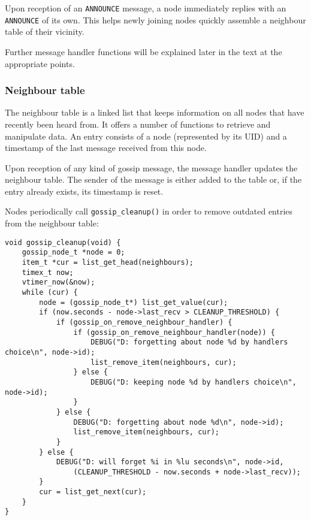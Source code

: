 \documentclass[11pt,
  a4paper,
  ngerman,
  BCOR=7mm
]{scrartcl}
\begin{document}
Upon reception of an \lstinline!ANNOUNCE! message, a node immediately
replies with an \lstinline!ANNOUNCE! of its own. This helps newly
joining nodes quickly assemble a neighbour table of their vicinity.

Further message handler functions will be explained later in the text at
the appropriate points.

\subsubsection*{Neighbour table}
\label{ssub:neighbour_table}
The neighbour table is a linked list that keeps information on all nodes
that have recently been heard from. It offers a number of functions to
retrieve and manipulate data. An entry consists of a node (represented
by its UID) and a timestamp of the last message received from this node.

Upon reception of any kind of gossip message, the message handler
updates the neighbour table. The sender of the message is either added
to the table or, if the entry already exists, its timestamp is reset. 

Nodes periodically call \lstinline!gossip_cleanup()! in order to remove
outdated entries from the neighbour table:

\newpage

\begin{lstlisting}
void gossip_cleanup(void) {
    gossip_node_t *node = 0;
    item_t *cur = list_get_head(neighbours);
    timex_t now;
    vtimer_now(&now);
    while (cur) {
        node = (gossip_node_t*) list_get_value(cur);
        if (now.seconds - node->last_recv > CLEANUP_THRESHOLD) {
            if (gossip_on_remove_neighbour_handler) {
                if (gossip_on_remove_neighbour_handler(node)) {
                    DEBUG("D: forgetting about node %d by handlers choice\n", node->id);
                    list_remove_item(neighbours, cur);
                } else {
                    DEBUG("D: keeping node %d by handlers choice\n", node->id);
                }
            } else {
                DEBUG("D: forgetting about node %d\n", node->id);
                list_remove_item(neighbours, cur);
            }
        } else {
            DEBUG("D: will forget %i in %lu seconds\n", node->id,
                (CLEANUP_THRESHOLD - now.seconds + node->last_recv));
        }
        cur = list_get_next(cur);
    }
}
\end{lstlisting}
\end{document}
